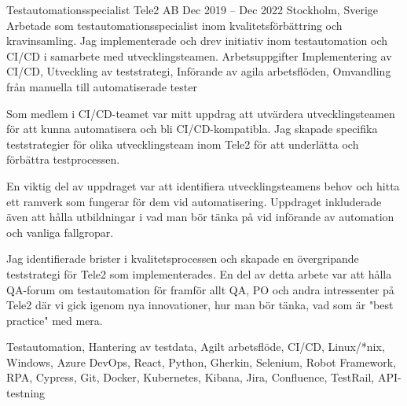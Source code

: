 \documentclass{sobCV}[2015/09/08]
\begin{document}
\experiencenode
   {Testautomationsspecialist}
   {Tele2 AB}
    {Dec 2019 -- Dec 2022}
   {Stockholm, Sverige}{
       Arbetade som testautomationsspecialist inom kvalitetsförbättring och kravinsamling. Jag implementerade och drev initiativ inom testautomation och CI/CD i samarbete med utvecklingsteamen.
   }
   {Arbetsuppgifter}{
      Implementering av CI/CD,
      Utveckling av teststrategi, 
      Införande av agila arbetsflöden,
      Omvandling från manuella till automatiserade tester
   }{
        {
           Som medlem i CI/CD-teamet var mitt uppdrag att utvärdera utvecklingsteamen för att kunna automatisera och bli CI/CD-kompatibla. Jag skapade specifika teststrategier för olika utvecklingsteam inom Tele2 för att underlätta och förbättra testprocessen.
       }

        {
           En viktig del av uppdraget var att identifiera utvecklingsteamens behov och hitta ett ramverk som fungerar för dem vid automatisering. Uppdraget inkluderade även att hålla utbildningar i vad man bör tänka på vid införande av automation och vanliga fallgropar.
       }

        {
           Jag identifierade brister i kvalitetsprocessen och skapade en övergripande teststrategi för Tele2 som implementerades. En del av detta arbete var att hålla QA-forum om testautomation för framför allt QA, PO och andra intressenter på Tele2 där vi gick igenom nya innovationer, hur man bör tänka, vad som är "best practice" med mera.
       }
   }{
       Testautomation,
       Hantering av testdata,
       Agilt arbetsflöde, 
       CI/CD, 
       Linux/*nix, 
       Windows, 
       Azure DevOps, 
       React, 
       Python, 
       Gherkin, 
       Selenium, 
       Robot Framework,
       RPA,
       Cypress, 
       Git, 
       Docker, 
       Kubernetes, 
       Kibana, 
       Jira, 
       Confluence, 
       TestRail, 
       API-testning 
   }

   
   
\end{document}
